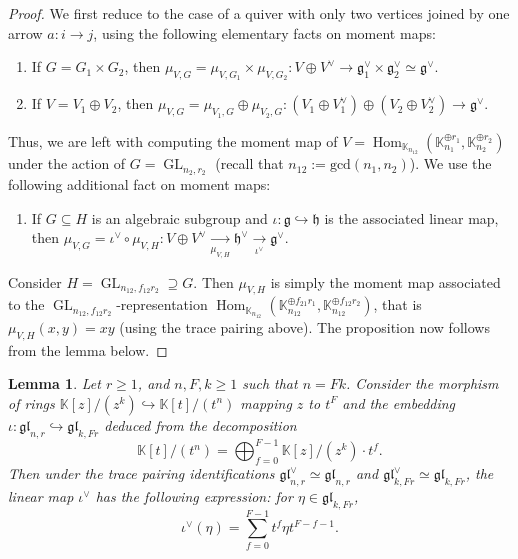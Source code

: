 \documentclass[11pt,english]{article}
\numberwithin{equation}{section}
\numberwithin{figure}{section}
\theoremstyle{definition}
\theoremstyle{plain}
\newtheorem{lem}[df]{Lemma}
\theoremstyle{remark}
\DeclareMathOperator{\Hom}{Hom}
\DeclareMathOperator{\GL}{GL}
\newcommand\KK{\mathbb{K}}
\begin{document}
\begin{proof}

We first reduce to the case of a quiver with only two vertices joined
by one arrow $a:i\rightarrow j$, using the following elementary facts
on moment maps:
\begin{enumerate}
\item If $G=G_{1}\times G_{2}$, then $\mu_{V,G}=\mu_{V,G_{1}}\times\mu_{V,G_{2}}:V\oplus V^{\vee}\rightarrow\mathfrak{g}_{1}^{\vee}\times\mathfrak{g}_{2}^{\vee}\simeq\mathfrak{g}^{\vee}$.
\item If $V=V_{1}\oplus V_{2}$, then $\mu_{V,G}=\mu_{V_{1},G}\oplus\mu_{V_{2},G}:(V_{1}\oplus V_{1}^{\vee})\oplus(V_{2}\oplus V_{2}^{\vee})\rightarrow\mathfrak{g}^{\vee}$.
\end{enumerate}
Thus, we are left with computing the moment map of $V=\Hom_{\KK_{n_{12}}}(\KK_{n_{1}}^{\oplus r_{1}},\KK_{n_{2}}^{\oplus r_{2}})$
under the action of $G=\GL_{n_{2},r_{2}}$ (recall that $n_{12}:=\mathrm{gcd}(n_{1},n_{2})$).
We use the following additional fact on moment maps:
\begin{enumerate}
\item[3.]  If $G\subseteq H$ is an algebraic subgroup and $\iota:\mathfrak{g}\hookrightarrow\mathfrak{h}$
is the associated linear map, then $\mu_{V,G}=\iota^{\vee}\circ\mu_{V,H}:V\oplus V^{\vee}\underset{\mu_{V,H}}{\longrightarrow}\mathfrak{h}^{\vee}\underset{\iota^{\vee}}{\longrightarrow}\mathfrak{g}^{\vee}$.
\end{enumerate}
Consider $H=\GL_{n_{12},f_{12}r_{2}}\supseteq G$. Then $\mu_{V,H}$
is simply the moment map associated to the $\GL_{n_{12},f_{12}r_{2}}$-representation
$\Hom_{\KK_{n_{12}}}(\KK_{n_{12}}^{\oplus f_{21}r_{1}},\KK_{n_{12}}^{\oplus f_{12}r_{2}})$,
that is $\mu_{V,H}(x,y)=xy$ (using the trace pairing above). The
proposition now follows from the lemma below. \end{proof}

\begin{lem}

Let $r\geq1$, and $n,F,k\geq1$ such that $n=Fk$. Consider the morphism
of rings $\KK[z]/(z^{k})\hookrightarrow\KK[t]/(t^{n})$ mapping $z$
to $t^{F}$ and the embedding $\iota:\mathfrak{gl}_{n,r}\hookrightarrow\mathfrak{gl}_{k,Fr}$
deduced from the decomposition\[
\KK[t]/(t^{n})=\bigoplus_{f=0}^{F-1}\KK[z]/(z^k)\cdot t^f.
\]Then under the trace pairing identifications $\mathfrak{gl}_{n,r}^{\vee}\simeq\mathfrak{gl}_{n,r}$
and $\mathfrak{gl}_{k,Fr}^{\vee}\simeq\mathfrak{gl}_{k,Fr}$, the
linear map $\iota^{\vee}$ has the following expression: for $\eta\in\mathfrak{gl}_{k,Fr}$,\[
\iota^{\vee}(\eta)=\sum_{f=0}^{F-1}t^f\eta t^{F-f-1}.
\]

\end{lem}
\end{document}
